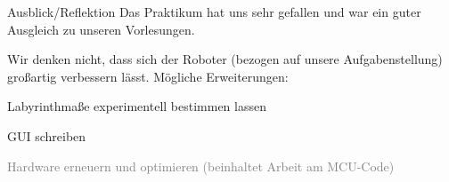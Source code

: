 \documentclass{beamer}
\begin{document}
\begin{frame}[fragile,t]{Ausblick/Reflektion}
Das Praktikum hat uns sehr gefallen und war ein guter Ausgleich zu unseren Vorlesungen.

\medskip\noindent
Wir denken nicht, dass sich der Roboter (bezogen auf unsere Aufgabenstellung) großartig verbessern lässt. Mögliche Erweiterungen:
\begin{itemize}
\item
\item Labyrinthmaße experimentell bestimmen lassen
\item GUI schreiben
\textcolor{gray}{
\item[\textcolor{gray}{$\triangleright$}] Hardware erneuern und optimieren (beinhaltet Arbeit am MCU-Code)
}
\end{itemize}
\end{frame}


\end{document}
